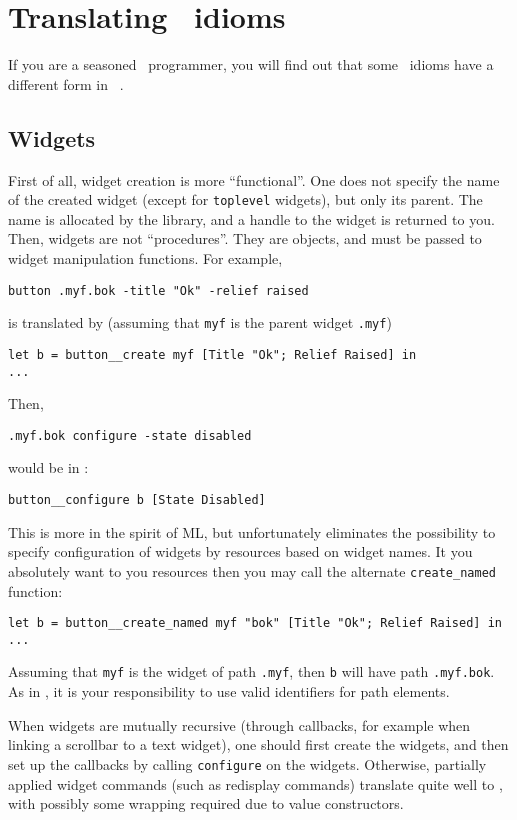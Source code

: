 \section{Translating \tk\ idioms}
If you are a seasoned \tk\ programmer, you will find out that some \tk\
idioms have a different form in \camltk\ .

\subsection{Widgets}
First of all, widget creation is more ``functional''. One does not specify
the name of the created widget (except for \verb|toplevel| widgets), but
only its parent. The name is allocated by the library, and a handle to the
widget is returned to you. Then, widgets are not ``procedures''. They are
objects, and must be passed to widget manipulation functions.
For example,
\begin{verbatim}
button .myf.bok -title "Ok" -relief raised
\end{verbatim} 
is translated by (assuming that \verb|myf| is the parent widget \verb|.myf|)
\begin{verbatim}
let b = button__create myf [Title "Ok"; Relief Raised] in
...
\end{verbatim} 
Then, 
\begin{verbatim}
.myf.bok configure -state disabled
\end{verbatim} 
would be in \caml:
\begin{verbatim}
button__configure b [State Disabled]
\end{verbatim} 

This is more in the spirit of ML, but unfortunately eliminates the
possibility to specify configuration of widgets by resources based on widget 
names. It you absolutely want to you resources then you may call the
alternate \verb|create_named| function:
\begin{verbatim}
let b = button__create_named myf "bok" [Title "Ok"; Relief Raised] in
...
\end{verbatim} 
Assuming that \verb|myf| is the widget of path \verb|.myf|, then \verb|b|
will have path \verb|.myf.bok|. As in \tk, it is your responsibility to use
valid identifiers for path elements.

When widgets are mutually recursive (through callbacks, for example when
linking a scrollbar to a text widget), one should first create the widgets,
and then set up the callbacks by calling \verb|configure| on the widgets.
Otherwise, partially applied widget commands (such as redisplay commands)
translate quite well to \caml, with possibly some wrapping required due to
value constructors.

